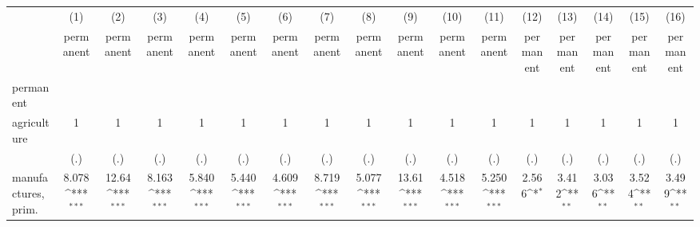 {
\def\sym#1{\ifmmode^{#1}\else\(^{#1}\)\fi}
\begin{tabular}{l*{16}{c}}
\hline\hline
                    &\multicolumn{1}{c}{(1)}&\multicolumn{1}{c}{(2)}&\multicolumn{1}{c}{(3)}&\multicolumn{1}{c}{(4)}&\multicolumn{1}{c}{(5)}&\multicolumn{1}{c}{(6)}&\multicolumn{1}{c}{(7)}&\multicolumn{1}{c}{(8)}&\multicolumn{1}{c}{(9)}&\multicolumn{1}{c}{(10)}&\multicolumn{1}{c}{(11)}&\multicolumn{1}{c}{(12)}&\multicolumn{1}{c}{(13)}&\multicolumn{1}{c}{(14)}&\multicolumn{1}{c}{(15)}&\multicolumn{1}{c}{(16)}\\
                    &\multicolumn{1}{c}{permanent}&\multicolumn{1}{c}{permanent}&\multicolumn{1}{c}{permanent}&\multicolumn{1}{c}{permanent}&\multicolumn{1}{c}{permanent}&\multicolumn{1}{c}{permanent}&\multicolumn{1}{c}{permanent}&\multicolumn{1}{c}{permanent}&\multicolumn{1}{c}{permanent}&\multicolumn{1}{c}{permanent}&\multicolumn{1}{c}{permanent}&\multicolumn{1}{c}{permanent}&\multicolumn{1}{c}{permanent}&\multicolumn{1}{c}{permanent}&\multicolumn{1}{c}{permanent}&\multicolumn{1}{c}{permanent}\\
\hline
permanent           &                     &                     &                     &                     &                     &                     &                     &                     &                     &                     &                     &                     &                     &                     &                     &                     \\
agriculture         &           1         &           1         &           1         &           1         &           1         &           1         &           1         &           1         &           1         &           1         &           1         &           1         &           1         &           1         &           1         &           1         \\
                    &         (.)         &         (.)         &         (.)         &         (.)         &         (.)         &         (.)         &         (.)         &         (.)         &         (.)         &         (.)         &         (.)         &         (.)         &         (.)         &         (.)         &         (.)         &         (.)         \\
[1em]
manufactures, prim. &       8.078\sym{***}&       12.64\sym{***}&       8.163\sym{***}&       5.840\sym{***}&       5.440\sym{***}&       4.609\sym{***}&       8.719\sym{***}&       5.077\sym{***}&       13.61\sym{***}&       4.518\sym{***}&       5.250\sym{***}&       2.566\sym{*}  &       3.412\sym{**} &       3.036\sym{**} &       3.524\sym{**} &       3.499\sym{**} \\

\end{tabular}}
